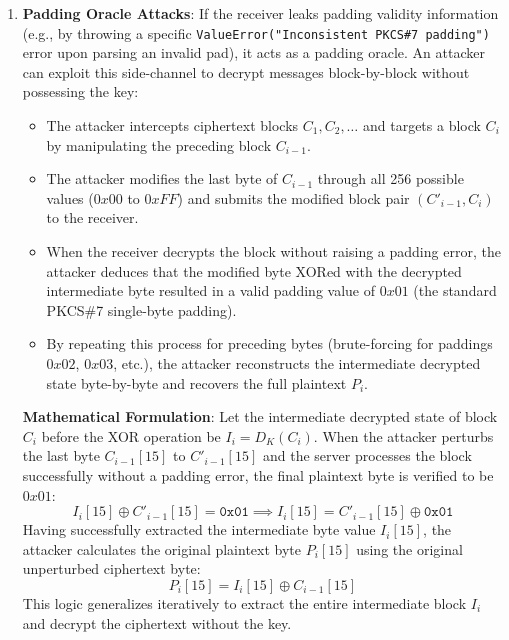 \documentclass[11pt,a4paper]{article}
\begin{document}
\begin{enumerate}
    \item \textbf{Padding Oracle Attacks}: If the receiver leaks padding validity information (e.g., by throwing a specific \texttt{ValueError("Inconsistent PKCS\#7 padding")} error upon parsing an invalid pad), it acts as a padding oracle. An attacker can exploit this side-channel to decrypt messages block-by-block without possessing the key:
    \begin{itemize}
        \item The attacker intercepts ciphertext blocks $C_1, C_2, \dots$ and targets a block $C_i$ by manipulating the preceding block $C_{i-1}$.
        \item The attacker modifies the last byte of $C_{i-1}$ through all 256 possible values ($0x00$ to $0xFF$) and submits the modified block pair $(C'_{i-1}, C_i)$ to the receiver.
        \item When the receiver decrypts the block without raising a padding error, the attacker deduces that the modified byte XORed with the decrypted intermediate byte resulted in a valid padding value of $0x01$ (the standard PKCS\#7 single-byte padding).
        \item By repeating this process for preceding bytes (brute-forcing for paddings $0x02$, $0x03$, etc.), the attacker reconstructs the intermediate decrypted state byte-by-byte and recovers the full plaintext $P_i$.
    \end{itemize}
    
    \textbf{Mathematical Formulation}: Let the intermediate decrypted state of block $C_i$ before the XOR operation be $I_i = D_K(C_i)$. When the attacker perturbs the last byte $C_{i-1}[15]$ to $C'_{i-1}[15]$ and the server processes the block successfully without a padding error, the final plaintext byte is verified to be $0x01$:
    \begin{equation}
        I_i[15] \oplus C'_{i-1}[15] = \mathtt{0x01} \implies I_i[15] = C'_{i-1}[15] \oplus \mathtt{0x01}
    \end{equation}
    Having successfully extracted the intermediate byte value $I_i[15]$, the attacker calculates the original plaintext byte $P_i[15]$ using the original unperturbed ciphertext byte:
    \begin{equation}
        P_i[15] = I_i[15] \oplus C_{i-1}[15]
    \end{equation}
    This logic generalizes iteratively to extract the entire intermediate block $I_i$ and decrypt the ciphertext without the key.
\end{enumerate}
\end{document}
